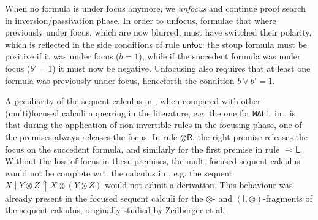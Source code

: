 \documentclass[runningheads]{llncs}
\newcommand{\tr}{\otimes \mathsf{R}}
\newcommand{\lleft}{{\multimap}\mathsf{L}}
\newcommand{\otR}{\tr}
\newcommand{\lolliL}{\lleft}
\newcommand{\ot}{\otimes}
\newcommand{\I}{\mathsf{I}}
\newcommand{\MALL}{\texttt{MALL}}
\newcommand{\up}{\Uparrow}
\newcommand{\unfoc}{\mathsf{unfoc}}
\begin{document}
When no formula is under focus anymore, we \emph{unfocus} and continue proof search in inversion/passivation phase. In order to unfocus, formulae that where previously under focus, which are now blurred, must have switched their polarity, which is reflected in the side conditions of rule $\unfoc$: the stoup formula must be positive if it was under focus ($b=1$), while if the succedent formula was under focus ($b' = 1$) it must now be negative. Unfocusing also requires that at least one formula was previously under focus, henceforth the condition $b \vee b' = 1$.

A peculiarity of the sequent calculus in , when compared with other (multi)focused calculi appearing in the literature, e.g. the one for \MALL\ in \cite{chaudhuri:canonical:2008}, is that during the application of non-invertible rules in the focusing phase, one of the premises always releases the focus. In rule $\otR$, the right premise releases the focus on the succedent formula, and similarly for the  first premise in rule $\lolliL$. Without the loss of focus in these premises, the multi-focused sequent calculus would not be complete wrt. the calculus in , e.g. the sequent $X \mid Y  \ot Z \up X \ot (Y \ot Z)$ would not admit a derivation. This behaviour was already present in the focused sequent calculi for the $\ot$- and $(\I,\ot)$-fragments of the sequent calculus, originally studied by Zeilberger et al. \cite{zeilberger:semiassociative:19,uustalu:sequent:2021}.
\end{document}
